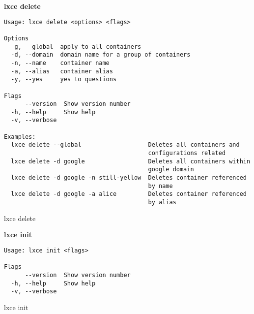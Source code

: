 \textbf{lxce delete}
\begin{listing}[H]
\begin{verbatim}
Usage: lxce delete <options> <flags>

Options
  -g, --global  apply to all containers                         
  -d, --domain  domain name for a group of containers            
  -n, --name    container name                                   
  -a, --alias   container alias                                 
  -y, --yes     yes to questions                                

Flags
      --version  Show version number                            
  -h, --help     Show help                                      
  -v, --verbose

Examples:
  lxce delete --global                   Deletes all containers and
                                         configurations related
  lxce delete -d google                  Deletes all containers within 
                                         google domain
  lxce delete -d google -n still-yellow  Deletes container referenced 
                                         by name
  lxce delete -d google -a alice         Deletes container referenced
                                         by alias
\end{verbatim}
\caption{lxce delete}
\label{listings: lxce delete}
\end{listing}

\textbf{lxce init}
\begin{listing}[H]
\begin{verbatim}
Usage: lxce init <flags>

Flags
      --version  Show version number                            
  -h, --help     Show help                                      
  -v, --verbose
\end{verbatim}
\caption{lxce init}
\label{listings: lxce init}
\end{listing}

